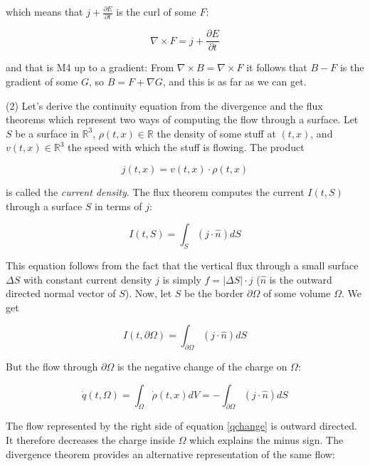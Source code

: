\documentclass{article}
\begin{document}
which means that $j + \frac{\partial E}{\partial t}$ is the curl of some $F$:

\begin{equation}
\nabla \times F = j + \frac{\partial E}{\partial t}
\end{equation}

and that is M4 up to a gradient: From $\nabla \times B = \nabla \times F$ it follows that $B - F$ is the gradient of some $G$, so $B = F + \nabla G$, and this is as far as we can get.

(2) Let's derive the continuity equation from the divergence and the flux theorems which represent two ways of computing the flow through a surface. Let $S$ be a surface in $\mathbb{R}^3$, $\rho(t, x) \in \mathbb{R}$ the density of some stuff at $(t, x)$, and $v(t, x) \in \mathbb{R}^3$ the speed with which the stuff is flowing. The product 

\begin{equation}
j(t, x) = v(t, x) \cdot \rho(t, x)
\end{equation}

is called the \emph{current density}. The flux theorem computes the current $I(t, S)$ through a surface $S$ in terms of $j$:

\begin{equation} \label{flux}
I(t, S) = \int_{S} (j \cdot \hat{n}) dS
\end{equation}

This equation follows from the fact that the vertical flux through a small surface $\Delta S$ with constant current density $j$ is simply $f = | \Delta S| \cdot j $ ($\hat n$ is the outward directed normal vector of $S$). Now, let $S$ be the border  $\partial \Omega$ of some volume $\Omega$. We get

\begin{equation} \label{flux1}
I(t, \partial \Omega) = \int_{\partial \Omega} (j \cdot \hat{n}) dS
\end{equation}

But the flow through $\partial \Omega$ is the negative change of the charge on $\Omega$:

\begin{equation} \label{qchange}
\dot q(t, \Omega) = \int_{\Omega} \dot \rho(t, x) dV = - \int_{\partial \Omega} (j \cdot \hat{n}) dS
\end{equation}

The flow represented by the right side of equation \ref{qchange} is outward directed. It therefore decreases the charge inside $\Omega$ which explains the minus sign. The divergence theorem provides an alternative representation of the same flow: 
\end{document}
